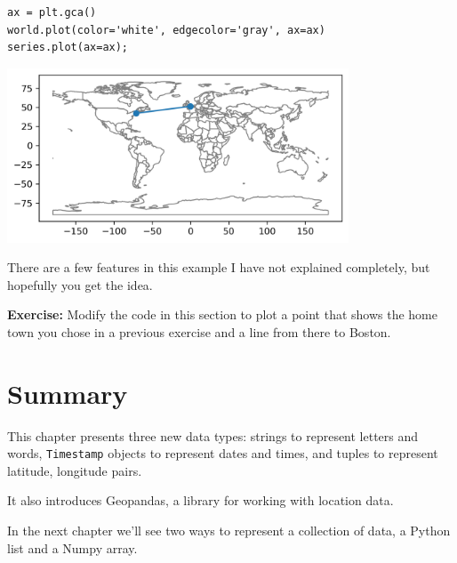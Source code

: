 \begin{lstlisting}[]
ax = plt.gca()
world.plot(color='white', edgecolor='gray', ax=ax)
series.plot(ax=ax);
\end{lstlisting}

\begin{center}
\includegraphics[width=4in]{02_times_files/02_times_130_0.png}
\end{center}

There are a few features in this example I have not explained
completely, but hopefully you get the idea.

\textbf{Exercise:} Modify the code in this section to plot a point that
shows the home town you chose in a previous exercise and a line from
there to Boston.

\hypertarget{summary}{%
\section{Summary}\label{summary}}

This chapter presents three new data types: strings to represent letters
and words, \passthrough{\lstinline!Timestamp!} objects to represent
dates and times, and tuples to represent latitude, longitude pairs.

It also introduces Geopandas, a library for working with location data.

In the next chapter we'll see two ways to represent a collection of
data, a Python list and a Numpy array.

